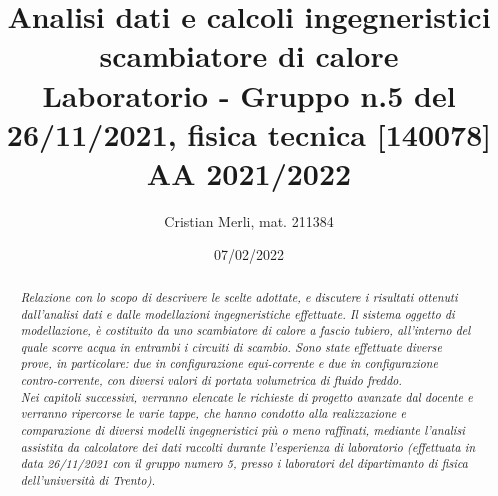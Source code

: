 \documentclass[a4paper,10pt]{article}                                                                                       %
\title{Analisi dati e calcoli ingegneristici scambiatore di calore\\                                                        %
\large Laboratorio - Gruppo n.5 del 26/11/2021, fisica tecnica [140078] AA 2021/2022}                                       %
\author{Cristian Merli, mat. 211384}                                                                                        %
\date{07/02/2022}                                                                                                           %
\begin{document}

\maketitle                                                                                                                  %
\vspace{5cm}                                                                                                                %
\begin{abstract}                                                                                                            %
  \noindent \textit{Relazione con lo scopo di descrivere le scelte adottate, e discutere i risultati  ottenuti dall'analisi
  dati e dalle modellazioni ingegneristiche effettuate. Il sistema oggetto di modellazione, è costituito da uno scambiatore
  di calore a fascio tubiero, all'interno del quale scorre acqua in entrambi i circuiti di scambio. Sono state effettuate
  diverse prove, in particolare: due in configurazione equi-corrente e due in configurazione contro-corrente, con diversi
  valori di portata volumetrica di fluido freddo.\\
  Nei capitoli successivi, verranno elencate le richieste di progetto avanzate dal docente e verranno ripercorse le varie
  tappe, che hanno condotto alla realizzazione e comparazione di diversi modelli ingegneristici più o meno raffinati,
  mediante l'analisi assistita da calcolatore dei dati raccolti durante l'esperienza di laboratorio (effettuata in data
  26/11/2021 con il gruppo numero 5, presso i laboratori del dipartimanto di fisica dell'università di Trento).}
\end{abstract}                                                                                                              %
\pagebreak                                                                                                                  %
\end{document}
